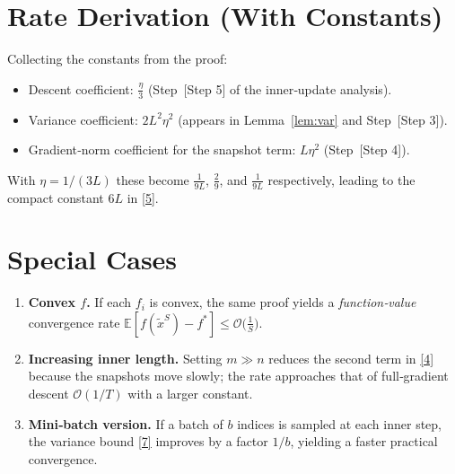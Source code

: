 \documentclass{article}
\newcommand{\E}{\mathbb{E}}
\begin{document}
\section*{Rate Derivation (With Constants)}
Collecting the constants from the proof:

\begin{itemize}
\item Descent coefficient: $\frac{\eta}{3}$ (Step~[Step 5] of the inner‑update analysis).
\item Variance coefficient: $2L^{2}\eta^{2}$ (appears in Lemma~\ref{lem:var} and Step~[Step 3]).
\item Gradient‑norm coefficient for the snapshot term: $L\eta^{2}$ (Step~[Step 4]).
\end{itemize}
With $\eta=1/(3L)$ these become $\frac{1}{9L}$, $\frac{2}{9}$, and $\frac{1}{9L}$ respectively, leading to the compact constant $6L$ in \eqref{5}.

\section*{Special Cases}
\begin{enumerate}
\item \textbf{Convex $f$.} If each $f_i$ is convex, the same proof yields a \emph{function‑value} convergence rate 
$\E[f(\tilde{x}^{S})-f^{*}]\le \mathcal{O}\big(\frac{1}{S}\big)$.
\item \textbf{Increasing inner length.} Setting $m\gg n$ reduces the second term in \eqref{4} because the snapshots move slowly; the rate approaches that of full‑gradient descent $\mathcal{O}(1/T)$ with a larger constant.
\item \textbf{Mini‑batch version.} If a batch of $b$ indices is sampled at each inner step, the variance bound \eqref{7} improves by a factor $1/b$, yielding a faster practical convergence.
\end{enumerate}
\end{document}
